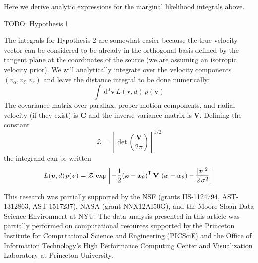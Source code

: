 \documentclass[manuscript, letterpaper]{aastex6}
\newcommand{\project}[1]{\textsl{#1}}
\newcommand{\acronym}[1]{{\small{#1}}}
\newcommand{\apogee}{\project{\acronym{APOGEE}}}
\newcommand{\dd}{\mathrm{d}}
\newcommand{\transp}[1]{{#1}^{\mathsf{T}}}
\newcommand{\bs}[1]{\boldsymbol{#1}}
\newcommand{\matrx}[1]{\mathbf{#1}}
\newcommand{\todo}[1]{{\color{red}TODO: #1}}
\begin{document}
\appendix

Here we derive analytic expressions for the marginal likelihood integrals above.

\todo{Hypothesis 1}

The integrals for Hypothesis 2 are somewhat easier because the true velocity
vector can be considered to be already in the orthogonal basis defined by the
tangent plane at the coordinates of the source (we are assuming an isotropic
velocity prior). We will analytically integrate over the velocity components
$(v_\alpha,v_\delta,v_r)$ and leave the distance integral to be done
numerically:
\begin{equation}
  \int \, \dd^3\bs{v} \, L(\bs{v}, d) \, p(\bs{v})
\end{equation}
The covariance matrix over parallax, proper motion components, and
radial velocity (if they exist) is $\matrx{C}$ and the inverse variance matrix
is $\matrx{V}$. Defining the constant
\begin{equation}
  \mathcal{Z} = \left[ \det \left(\frac{\matrx{V}}{2\pi} \right) \right]^{1/2}
\end{equation}
the integrand can be written
\begin{equation}
  L(\bs{v}, d) \, p(\bs{v}) = \mathcal{Z} \,
    \exp \left[ -\frac{1}{2} \transp{\left(\bs{x} - \bs{x}_\theta \right)} \,
    \matrx{V} \,
    \left(\bs{x} - \bs{x}_\theta \right)
    - \frac{|\bs{v}|^2}{2\,\sigma^2} \right] \\
\end{equation}

\acknowledgements

This research was partially supported by the \acronym{NSF} (grants
  \acronym{IIS-1124794}, \acronym{AST-1312863}, \acronym{AST-1517237}),
  \acronym{NASA} (grant \acronym{NNX12AI50G}),
  and the Moore-Sloan Data Science Environment at \acronym{NYU}. The data
analysis presented in this article was partially performed on computational
resources supported by the Princeton Institute for Computational Science and
Engineering (PICSciE) and the Office of Information Technology's High
Performance Computing Center and Visualization Laboratory at Princeton
University.





\end{document}
